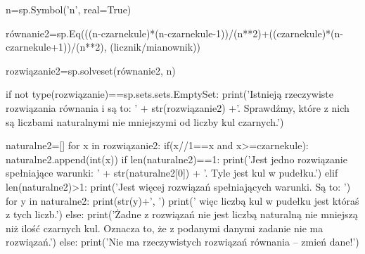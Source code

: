\documentclass{mwart}
\begin{document}
\begin{pycode}
n=sp.Symbol('n', real=True)

równanie2=sp.Eq(((n-czarnekule)*(n-czarnekule-1))/(n**2)+((czarnekule)*(n-czarnekule+1))/(n**2), (licznik/mianownik))

rozwiązanie2=sp.solveset(równanie2, n)

if not type(rozwiązanie)==sp.sets.sets.EmptySet:
	print('Istnieją rzeczywiste rozwiązania równania i są to: ' + str(rozwiązanie2) +'. Sprawdźmy, które z nich są liczbami naturalnymi nie mniejszymi od liczby kul czarnych.')

	naturalne2=[]
	for x in rozwiązanie2:
		if(x//1==x and x>=czarnekule):
			naturalne2.append(int(x))
	if len(naturalne2)==1:
		print('Jest jedno rozwiązanie spełniające warunki: ' + str(naturalne2[0]) + '. Tyle jest kul w pudełku.')
	elif len(naturalne2)>1:
		print('Jest więcej rozwiązań spełniających warunki. Są to: ')
		for y in naturalne2:
			print(str(y)+', ')
		print(' więc liczbą kul w pudełku jest któraś z tych liczb.')
	else:
		print('Żadne z rozwiązań nie jest liczbą naturalną nie mniejszą niż ilość czarnych kul. Oznacza to, że z podanymi danymi zadanie nie ma rozwiązań.')
else:
	print('Nie ma rzeczywistych rozwiązań równania – zmień dane!')
\end{pycode}
\end{document}
